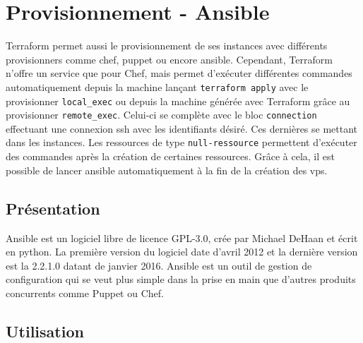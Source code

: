 \documentclass[]{article}
\begin{document}
\newpage
\section{Provisionnement - Ansible}\label{provisionnement}

Terraform permet aussi le provisionnement de ses instances avec
différents provisionners comme chef, puppet ou encore ansible.
Cependant, Terraform n'offre un service que pour Chef, mais permet
d'exécuter différentes commandes automatiquement depuis la machine
lançant \texttt{terraform\ apply} avec le provisionner
\texttt{local\_exec} ou depuis la machine générée avec Terraform grâce
au provisionner \texttt{remote\_exec}. Celui-ci se complète avec le bloc
\texttt{connection} effectuant une connexion ssh avec les identifiants
désiré. Ces dernières se mettant dans les instances. Les ressources de
type \texttt{null-ressource} permettent d'exécuter des commandes après
la création de certaines ressources. Grâce à cela, il est possible de
lancer ansible automatiquement à la fin de la création des vps.

\subsection{Présentation}\label{pruxe9sentation}

Ansible est un logiciel libre de licence GPL-3.0, crée par Michael
DeHaan et écrit en python. La première version du logiciel date d'avril
2012 et la dernière version est la 2.2.1.0 datant de janvier 2016.
Ansible est un outil de gestion de configuration qui se veut plus simple
dans la prise en main que d'autres produits concurrents comme Puppet ou
Chef.

\subsection{Utilisation}\label{utilisation}
\end{document}
